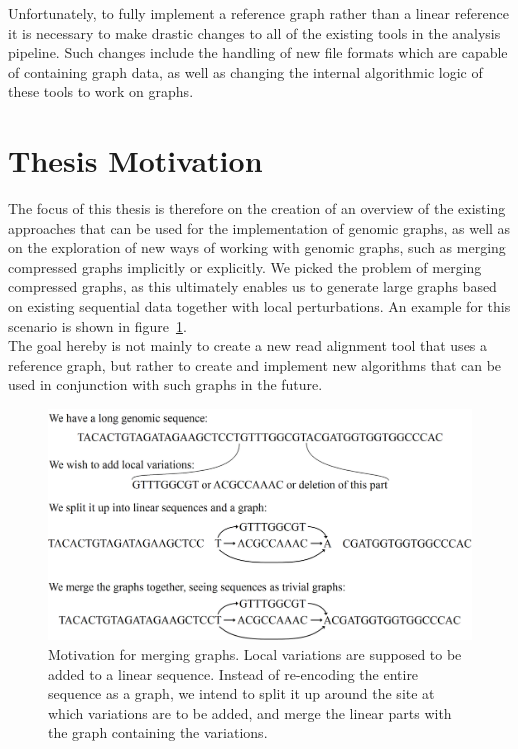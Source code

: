 \documentclass[a4paper,12pt,twoside,BCOR=10mm]{scrbook}
\begin{document}
Unfortunately, to fully implement a reference graph rather than a linear reference
it is necessary to make drastic changes to all of the existing tools in the analysis pipeline.
Such changes include the handling of new file formats which are capable of containing graph data,
as well as changing the internal algorithmic logic of these tools to work on graphs.

\section{Thesis Motivation}

The focus of this thesis is therefore on the creation of an overview of the existing
approaches that can be used for the implementation of genomic graphs,
as well as on the exploration of new ways of working with genomic graphs,
such as merging compressed graphs implicitly or explicitly.
We picked the problem of merging compressed graphs,
as this ultimately enables us to generate large graphs
based on existing sequential data together with local perturbations.
An example for this scenario is shown in figure~\ref{fig:evo_fig_add_perturbations_to_long_seq}. \\
The goal hereby is not mainly to create a new read alignment tool that uses
a reference graph, but rather to create and implement new algorithms that can
be used in conjunction with such graphs in the future.

\begin{figure}[!htb]
\centering
\includegraphics[width=\textwidth]{evo_fig_add_perturbations_to_long_seq.png}
\caption[Motivation for merging graphs]{Motivation for merging graphs. Local variations are supposed to be added to a linear sequence. Instead of re-encoding the entire sequence as a graph, we intend to split it up around the site at which variations are to be added, and merge the linear parts with the graph containing the variations.} \label{fig:evo_fig_add_perturbations_to_long_seq}
\end{figure}
\end{document}
